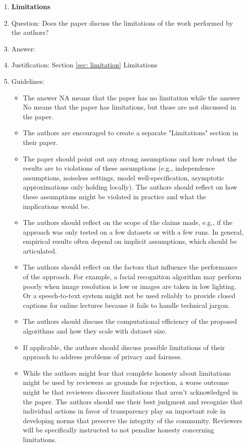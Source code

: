 \documentclass{article}
\begin{document}
\begin{enumerate}
\item {\bf Limitations}
    \item[] Question: Does the paper discuss the limitations of the work performed by the authors?
    \item[] Answer: \answerYes{} %
    \item[] Justification: Section \ref{sec: limitation} Limitations
    \item[] Guidelines:
    \begin{itemize}
        \item The answer NA means that the paper has no limitation while the answer No means that the paper has limitations, but those are not discussed in the paper. 
        \item The authors are encouraged to create a separate "Limitations" section in their paper.
        \item The paper should point out any strong assumptions and how robust the results are to violations of these assumptions (e.g., independence assumptions, noiseless settings, model well-specification, asymptotic approximations only holding locally). The authors should reflect on how these assumptions might be violated in practice and what the implications would be.
        \item The authors should reflect on the scope of the claims made, e.g., if the approach was only tested on a few datasets or with a few runs. In general, empirical results often depend on implicit assumptions, which should be articulated.
        \item The authors should reflect on the factors that influence the performance of the approach. For example, a facial recognition algorithm may perform poorly when image resolution is low or images are taken in low lighting. Or a speech-to-text system might not be used reliably to provide closed captions for online lectures because it fails to handle technical jargon.
        \item The authors should discuss the computational efficiency of the proposed algorithms and how they scale with dataset size.
        \item If applicable, the authors should discuss possible limitations of their approach to address problems of privacy and fairness.
        \item While the authors might fear that complete honesty about limitations might be used by reviewers as grounds for rejection, a worse outcome might be that reviewers discover limitations that aren't acknowledged in the paper. The authors should use their best judgment and recognize that individual actions in favor of transparency play an important role in developing norms that preserve the integrity of the community. Reviewers will be specifically instructed to not penalize honesty concerning limitations.
    \end{itemize}


\end{enumerate}
\end{document}

